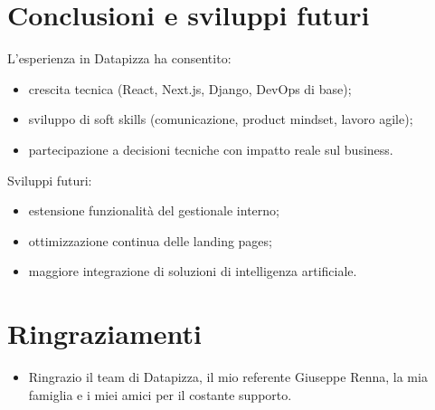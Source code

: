 \documentclass[12pt,a4paper,openright,twoside]{book}
\begin{document}
\chapter{Conclusioni e sviluppi futuri}
L’esperienza in Datapizza ha consentito:
\begin{itemize}
  \item crescita tecnica (React, Next.js, Django, DevOps di base);
  \item sviluppo di soft skills (comunicazione, product mindset, lavoro agile);
  \item partecipazione a decisioni tecniche con impatto reale sul business.
\end{itemize}

Sviluppi futuri:
\begin{itemize}
  \item estensione funzionalità del gestionale interno;
  \item ottimizzazione continua delle landing pages;
  \item maggiore integrazione di soluzioni di intelligenza artificiale.
\end{itemize}



\backmatter

\nocite{*} %




\chapter{Ringraziamenti}
\begin{itemize}
\item Ringrazio il team di Datapizza, il mio referente Giuseppe Renna,
la mia famiglia e i miei amici per il costante supporto.
\end{itemize}
\end{document}
